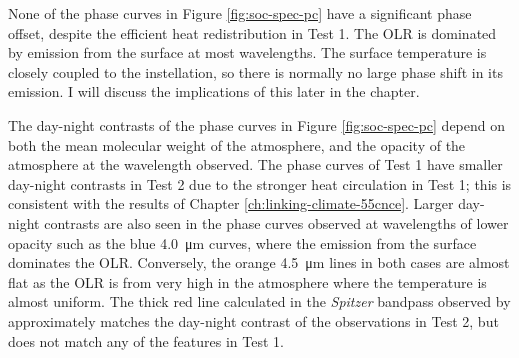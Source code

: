None of the phase curves in Figure \ref{fig:soc-spec-pc} have a significant phase offset, despite the efficient heat redistribution in Test 1. The OLR is dominated by emission from the surface at most wavelengths. The surface temperature is closely coupled to the instellation, so there is normally no large phase shift in its emission. I will discuss the implications of this later in the chapter.

The day-night contrasts of the phase curves in Figure \ref{fig:soc-spec-pc} depend on both the mean molecular weight of the atmosphere, and the opacity of the atmosphere at the wavelength observed. The phase curves of Test 1 have smaller day-night contrasts in Test 2 due to the stronger heat circulation in Test 1; this is consistent with the results of Chapter \ref{ch:linking-climate-55cnce}. Larger day-night contrasts are also seen in the phase curves observed at wavelengths of lower opacity such as the blue \SI{4.0}{\micro\metre} curves, where the emission from the surface dominates the OLR. Conversely, the orange \SI{4.5}{\micro\metre} lines in both cases are almost flat as the OLR is from very high in the atmosphere where the temperature is almost uniform. The thick red line calculated in the \textit{Spitzer} bandpass observed by \citet{demory201655cnce} approximately matches the day-night contrast of the observations in Test 2, but does not match any of the features in Test 1.









